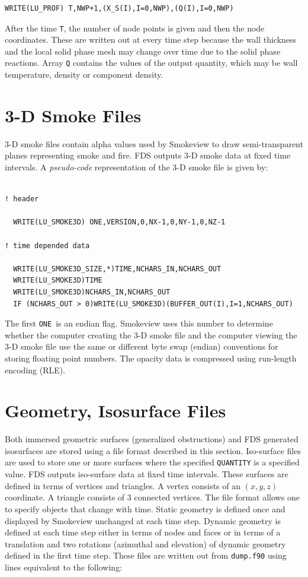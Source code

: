 \documentclass[11pt]{book}
\newcommand{\ct}{\tt\small}
\begin{document}
\footnotesize
\begin{verbatim}
WRITE(LU_PROF) T,NWP+1,(X_S(I),I=0,NWP),(Q(I),I=0,NWP)
\end{verbatim}
\normalsize
After the time {\ct T}, the number of node points is given and then
the node coordinates. These are written out at every time step because
the wall thickness and the local solid phase mesh may change over time
due to the solid phase reactions. Array {\ct Q} contains the values of
the output quantity, which may be wall temperature, density or
component density.

\section{3-D Smoke Files}
\label{out:SMOKE3D}

3-D smoke files contain alpha values used by Smokeview to draw
semi-transparent planes representing smoke and fire.
FDS outputs 3-D smoke data at fixed time
intervals.  A {\em pseudo-code} representation of the 3-D
smoke file is given by:

\footnotesize
\begin{verbatim}

! header

  WRITE(LU_SMOKE3D) ONE,VERSION,0,NX-1,0,NY-1,0,NZ-1

! time depended data

  WRITE(LU_SMOKE3D_SIZE,*)TIME,NCHARS_IN,NCHARS_OUT
  WRITE(LU_SMOKE3D)TIME
  WRITE(LU_SMOKE3D)NCHARS_IN,NCHARS_OUT
  IF (NCHARS_OUT > 0)WRITE(LU_SMOKE3D)(BUFFER_OUT(I),I=1,NCHARS_OUT)

\end{verbatim}
\normalsize

\noindent
The first {\ct ONE}\ is an endian flag.  Smokeview uses this number to
determine whether the computer creating the 3-D smoke file and the
computer viewing the 3-D smoke file use the same or different byte
swap (endian) conventions for storing floating point numbers.  The
opacity data is compressed using run-length encoding (RLE).


\section{Geometry, Isosurface Files}
\label{out:GEOMETRY}

Both immersed geometric surfaces (generalized obstructions) and FDS generated isosurfaces are stored using a file format described in this section.
Iso-surface files are used to store one or more surfaces where the specified {\ct QUANTITY} is a specified value.
FDS outputs iso-surface data at fixed
time intervals.  These surfaces are
defined in terms of vertices and triangles.  A vertex consists of an $(x,y,z)$ coordinate.
A triangle
consists of 3 connected vertices.  The file format allows one to specify objects that change with time.
Static geometry is defined once and displayed by Smokeview unchanged at each time step.
Dynamic geometry is defined at each time step either in terms of nodes and faces
or in terms of a translation and two rotations (azimuthal and elevation) of dynamic geometry defined
in the first time step.
These files are written out from {\ct dump.f90} using lines equivalent to the following:
\end{document}
